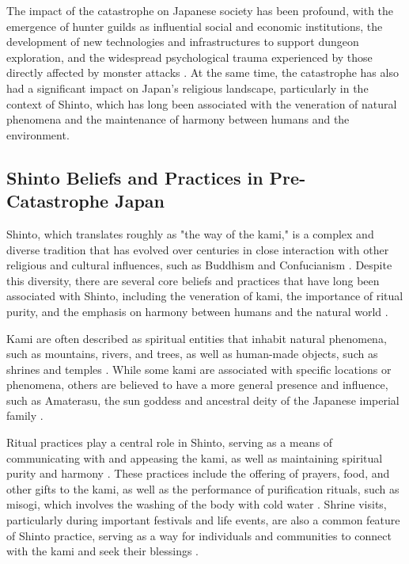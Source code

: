 \documentclass[12pt, a4paper]{article}
\begin{document}
The impact of the catastrophe on Japanese society has been profound, with the emergence of hunter guilds as influential social and economic institutions, the development of new technologies and infrastructures to support dungeon exploration, and the widespread psychological trauma experienced by those directly affected by monster attacks \citep{nakamura2027}. At the same time, the catastrophe has also had a significant impact on Japan's religious landscape, particularly in the context of Shinto, which has long been associated with the veneration of natural phenomena and the maintenance of harmony between humans and the environment.

\subsection{Shinto Beliefs and Practices in Pre-Catastrophe Japan}
Shinto, which translates roughly as "the way of the kami," is a complex and diverse tradition that has evolved over centuries in close interaction with other religious and cultural influences, such as Buddhism and Confucianism \citep{breen2010}. Despite this diversity, there are several core beliefs and practices that have long been associated with Shinto, including the veneration of kami, the importance of ritual purity, and the emphasis on harmony between humans and the natural world \citep{hardacre2017}.

Kami are often described as spiritual entities that inhabit natural phenomena, such as mountains, rivers, and trees, as well as human-made objects, such as shrines and temples \citep{nelson2000}. While some kami are associated with specific locations or phenomena, others are believed to have a more general presence and influence, such as Amaterasu, the sun goddess and ancestral deity of the Japanese imperial family \citep{breen2010}.

Ritual practices play a central role in Shinto, serving as a means of communicating with and appeasing the kami, as well as maintaining spiritual purity and harmony \citep{nelson2000}. These practices include the offering of prayers, food, and other gifts to the kami, as well as the performance of purification rituals, such as misogi, which involves the washing of the body with cold water \citep{picken2002}. Shrine visits, particularly during important festivals and life events, are also a common feature of Shinto practice, serving as a way for individuals and communities to connect with the kami and seek their blessings \citep{reader1998}.
\end{document}
